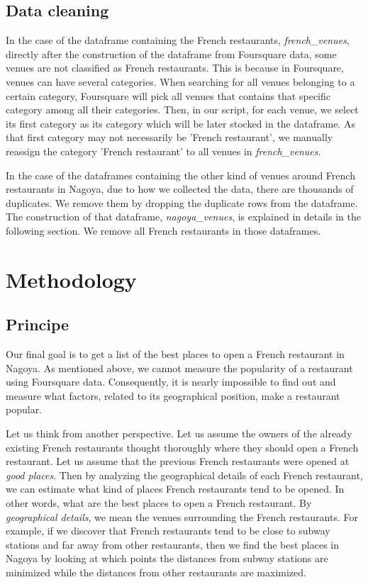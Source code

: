 \documentclass[12pt,a4paper]{article}
\begin{document}
\subsection{Data cleaning}

In the case of the dataframe containing the French restaurants, \textit{french\_venues}, directly after the construction of the dataframe from Foursquare data, some venues are not classified as French restaurants. This is because in Foursquare, venues can have several categories. When searching for all venues belonging to a certain category, Foursquare will pick all venues that contains that specific category among all their categories. Then, in our script, for each venue, we select its first category as its category which will be later stocked in the dataframe. As that first category may not necessarily be 'French restaurant', we manually reassign the category 'French restaurant' to all venues in \textit{french\_venues}.

\medskip

In the case of the dataframes containing the other kind of venues around French restaurants in Nagoya, due to how we collected the data, there are thousands of duplicates. We remove them by dropping the duplicate rows from the dataframe. The construction of that dataframe, \textit{nagoya\_venues}, is explained in details in the following section. We remove all French restaurants in those dataframes. 

\section{Methodology}

\subsection*{Principe}

Our final goal is to get a list of the best places to open a French restaurant in Nagoya. As mentioned above, we cannot measure the popularity of a restaurant using Foursquare data. Consequently, it is nearly impossible to find out and measure what factors, related to its geographical position, make a restaurant popular. 

\medskip

Let us think from another perspective. Let us assume the owners of the already existing French restaurants thought thoroughly where they should open a French restaurant. Let us assume that the previous French restaurants were opened at \textit{good places}. Then by analyzing the geographical details of each French restaurant, we can estimate what kind of places French restaurants tend to be opened. In other words, what are the best places to open a French restaurant. By \textit{geographical details}, we mean the venues surrounding the French restaurants. For example, if we discover that French restaurants tend to be close to subway stations and far away from other restaurants, then we find the best places in Nagoya by looking at which points the distances from subway stations are minimized while the distances from other restaurants are maximized. 
\end{document}
